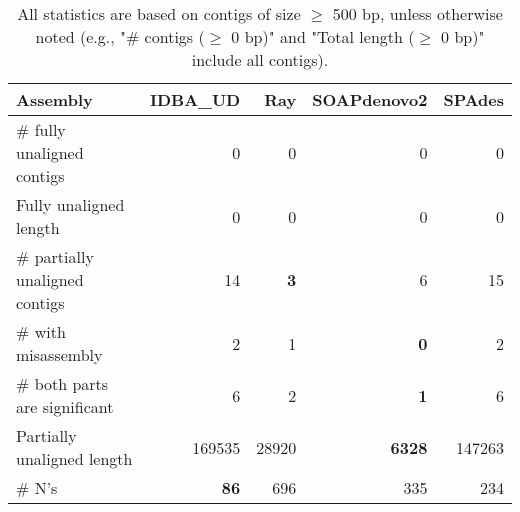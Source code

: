 \documentclass[12pt,a4paper]{article}
\begin{document}
\begin{table}[ht]
\begin{center}
\caption{All statistics are based on contigs of size $\geq$ 500 bp, unless otherwise noted (e.g., "\# contigs ($\geq$ 0 bp)" and "Total length ($\geq$ 0 bp)" include all contigs).}
\begin{tabular}{|l*{4}{|r}|}
\hline
Assembly & IDBA\_UD & Ray & SOAPdenovo2 & SPAdes \\ \hline
\# fully unaligned contigs & 0 & 0 & 0 & 0 \\ \hline
Fully unaligned length & 0 & 0 & 0 & 0 \\ \hline
\# partially unaligned contigs & 14 & {\bf 3} & 6 & 15 \\ \hline
\hspace{5mm}\# with misassembly & 2 & 1 & {\bf 0} & 2 \\ \hline
\hspace{5mm}\# both parts are significant & 6 & 2 & {\bf 1} & 6 \\ \hline
Partially unaligned length & 169535 & 28920 & {\bf 6328} & 147263 \\ \hline
\# N's & {\bf 86} & 696 & 335 & 234 \\ \hline
\end{tabular}
\end{center}
\end{table}
\end{document}
